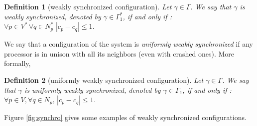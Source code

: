 \documentclass[11pt,english,letterpaper]{article}
\newtheorem{definition}{Definition}
\begin{document}
\begin{definition}[weakly synchronized configuration]
Let $\gamma \in \Gamma$. We say that $\gamma$ is weakly synchronized, denoted by $\gamma \in \Gamma_{1}^{*}$, if and only if :	$\forall p \in V^{*}\,\forall q \in N_{p}^{*}\,\,|c_{p}-c_{q}|\leq 1$.
\end{definition}
	
We say that a configuration of the system is \emph{uniformly weakly synchronized} if any processor is in unison with all its neighbors (even with crashed ones). More formally,
 
\begin{definition}[uniformly weakly synchronized configuration]
Let $\gamma \in \Gamma$. We say that $\gamma$ is uniformly weakly synchronized, denoted by $\gamma \in \Gamma_{1}$, if and only if : $\forall p \in V,\forall q \in N_{p},\,|c_{p}-c_{q}|\leq 1$.
\end{definition}
	
Figure \ref{fig:synchro} gives some examples of weakly synchronized configurations.
\end{document}
